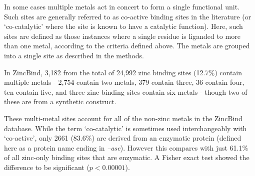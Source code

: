 In some cases multiple metals act in concert to form a single functional unit. Such sites are generally referred to as co-active binding sites in the literature (or `co-catalytic' where the site is known to have a catalytic function). Here, such sites are defined as those instances where a single residue is liganded to more than one metal, according to the criteria defined above. The metals are grouped into a single site as described in the methods.

In ZincBind, 3,182 from the total of 24,992 zinc binding sites (12.7\%) contain multiple metals - 2,754 contain two metals, 379 contain three, 36 contain four, ten contain five, and three zinc binding sites contain six metals - though two of these are from a synthetic construct.

These multi-metal sites account for all of the non-zinc metals in the ZincBind database. While the term `co-catalytic' is sometimes used interchangeably with `co-active', only 2661 (83.6\%) are derived from an enzymatic protein (defined here as a protein name ending in \emph{--ase}). However this compares with just 61.1\% of all zinc-only binding sites that are enzymatic. A Fisher exact test showed the difference to be significant ($p<0.00001$).